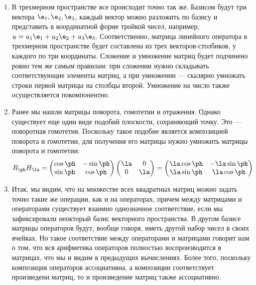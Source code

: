 \begin{enumerate}
\item В трехмерном пространстве все происходит точно так же. Базисом будут три вектора $\e_1,\e_2,\e_3$, каждый вектор можно разложить по базису и представить в координатной форме тройкой чисел, например, $u=u_1\e_1+u_2\e_2+u_3\e_3$. Соответственно, матрица линейного оператора в трехмерном пространстве будет составлена из трех векторов-столбиков, у каждого по три координаты. Сложение и умножение матриц будет подчинено ровно тем же самым правилам: при сложении нужно складывать соответствующие элементы матриц, а при умножении --- скалярно умножать строки первой матрицы на столбцы второй. Умножение на число также осуществляется покомпонентно.

\item Ранее мы нашли матрицы поворота, гомотетии и отражения. Однако существует еще один виде подобий плоскости, сохраняющий точку. Это --- поворотная гомотетия. Поскольку такое подобие является композицией поворота и гомотетии, для получения его матрицы нужно умножить матрицы поворота и гомотетии:
$$
R_\ph H_\la = 
\begin{pmatrix}
\cos\ph & -\sin\ph \\ \sin\ph & \cos\ph
\end{pmatrix}
\begin{pmatrix}
\la & 0 \\ 0 & \la
\end{pmatrix} =
\begin{pmatrix}
\la\cos\ph & -\la\sin\ph \\ \la\sin\ph & \la\cos\ph
\end{pmatrix}
$$



\item Итак, мы видим, что на множестве всех квадратных матриц можно задать точно такие же операции, как и на операторах, причем между матрицами и операторами существует взаимно однозначное соответствие, если мы зафиксировали неокторый базис векторного пространства. В другом базисе матрицы операторов будут, вообще говоря, иметь другой набор чисел в своих ячейках. Но такое соответствие между операторами и матрицами говорит нам о том, что вся арифметика операторов полностью воспроизводится в матрицах, что мы и видим в предыдущих вычислениях. Более того, поскольку композиция операторов ассоциативна, а композиции соответствует произведени матриц, то и произведение матриц также ассоциативно.


\end{enumerate}
